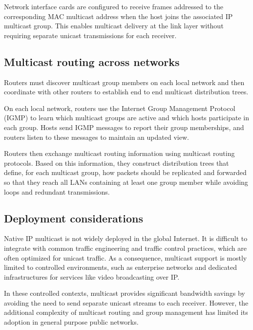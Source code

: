 \begin{center}
\end{center}

Network interface cards are configured to receive frames addressed to the corresponding MAC multicast address when the host joins the associated IP multicast group. This enables multicast delivery at the link layer without requiring separate unicast transmissions for each receiver.

\subsection{Multicast routing across networks}

Routers must discover multicast group members on each local network and then coordinate with other routers to establish end to end multicast distribution trees.

On each local network, routers use the Internet Group Management Protocol (IGMP) to learn which multicast groups are active and which hosts participate in each group. Hosts send IGMP messages to report their group memberships, and routers listen to these messages to maintain an updated view.

Routers then exchange multicast routing information using multicast routing protocols. Based on this information, they construct distribution trees that define, for each multicast group, how packets should be replicated and forwarded so that they reach all LANs containing at least one group member while avoiding loops and redundant transmissions.

\subsection{Deployment considerations}

Native IP multicast is not widely deployed in the global Internet. It is difficult to integrate with common traffic engineering and traffic control practices, which are often optimized for unicast traffic. As a consequence, multicast support is mostly limited to controlled environments, such as enterprise networks and dedicated infrastructures for services like video broadcasting over IP.

In these controlled contexts, multicast provides significant bandwidth savings by avoiding the need to send separate unicast streams to each receiver. However, the additional complexity of multicast routing and group management has limited its adoption in general purpose public networks.

